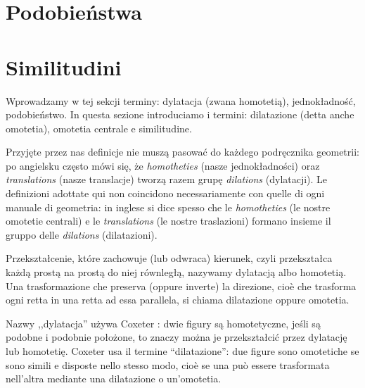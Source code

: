 
%

\section{Podobieństwa} %
\section{Similitudini} %

Wprowadzamy w tej sekcji terminy: dylatacja (zwana homotetią), jednokładność, podobieństwo. %
In questa sezione introduciamo i termini: dilatazione (detta anche omotetia), omotetia centrale e similitudine. %

Przyjęte przez nas definicje nie muszą pasować do każdego podręcznika geometrii: po angielsku często mówi się, że \emph{homotheties} (nasze jednokładności) oraz \emph{translations} (nasze translacje) tworzą razem grupę \emph{dilations} (dylatacji). %
Le definizioni adottate qui non coincidono necessariamente con quelle di ogni manuale di geometria: in inglese si dice spesso che le \emph{homotheties} (le nostre omotetie centrali) e le \emph{translations} (le nostre traslazioni) formano insieme il gruppo delle \emph{dilations} (dilatazioni). %



\begin{definition}
[homotetia] %
[omotetia] %
    Przekształcenie, które zachowuje (lub odwraca) kierunek, czyli przekształca każdą prostą na prostą do niej równległą, nazywamy dylatacją albo homotetią. %
    Una trasformazione che preserva (oppure inverte) la direzione, cioè che trasforma ogni retta in una retta ad essa parallela, si chiama dilatazione oppure omotetia. %
\end{definition}

Nazwy ,,dylatacja'' używa Coxeter \cite[s. 84]{coxeter_1967}: dwie figury są homotetyczne, jeśli są podobne i podobnie położone, to znaczy można je przekształcić przez dylatację lub homotetię. %
Coxeter \cite[p.~84]{coxeter_1967} usa il termine ``dilatazione'': due figure sono omotetiche se sono simili e disposte nello stesso modo, cioè se una può essere trasformata nell'altra mediante una dilatazione o un'omotetia. %

